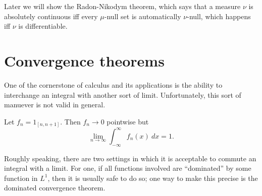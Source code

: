 \begin{subsec}
Later we will show the Radon-Nikodym theorem, which says that a measure $\nu$ is absolutely continuous iff every $\mu$-null set is automatically $\nu$-null, which happens iff $\nu$ is differentiable.
\end{subsec}


\section{Convergence theorems}
One of the cornerstone of calculus and its applications is the ability to interchange an integral with another sort of limit.
Unfortunately, this sort of manuever is not valid in general.

\begin{example}
Let $f_{n} = 1_{[n, n + 1]}$. Then $f_{n} \to 0$ pointwise but
\[\lim_{n \to \infty} \int_{-\infty}^{\infty} f_{n}(x) ~dx = 1.\]
\end{example}

\begin{subsec}
Roughly speaking, there are two settings in which it is acceptable to commute an integral with a limit.
For one, if all functions involved are ``dominated'' by some function in $L^{1}$, then it is usually safe to do so; one way to make this precise is the dominated convergence theorem.
\end{subsec}

